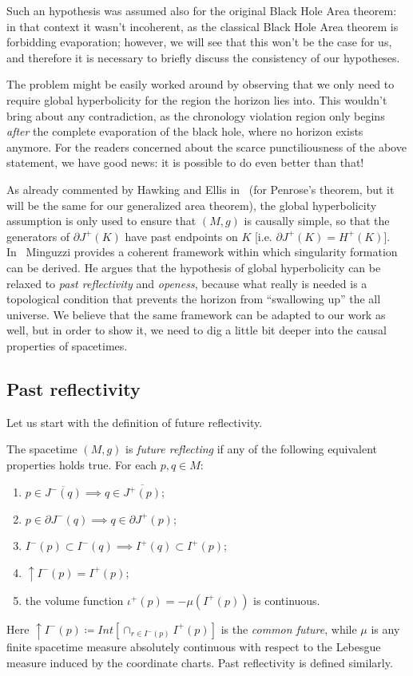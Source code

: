 Such an hypothesis was assumed also for the original Black Hole Area theorem: in that context it wasn't incoherent, as the classical Black Hole Area theorem is forbidding evaporation; however, we will see that this won't be the case for us, and therefore it is necessary to briefly discuss the consistency of our hypotheses.

The problem might be easily worked around by observing that we only need to require global hyperbolicity for the region the horizon lies into. This wouldn't bring about any contradiction, as the chronology violation region only begins \emph{after} the complete evaporation of the black hole, where no horizon exists anymore. For the readers concerned about the scarce punctiliousness of the above statement, we have good news: it is possible to do even better than that! 

As already commented by Hawking and Ellis in~\cite[]{hawking1973large} (for Penrose's theorem, but it will be the same for our generalized area theorem), the global hyperbolicity assumption is only used to ensure that \((M, g)\) is causally simple, so that the generators of \(\partial J^+(K)\) have past endpoints on \(K\) [i.e. \(\partial J^+(K) = H^+(K)\)].
In~\cite{minguzzi2020gravitational} Minguzzi provides a coherent framework within which singularity formation can be derived. He argues that the hypothesis of global hyperbolicity can be relaxed to \emph{past reflectivity} and \emph{openess}, because what really is needed is a topological condition that prevents the horizon from ``swallowing up'' the all universe. We believe that the same framework can be adapted to our work as well, but in order to show it, we need to dig a little bit deeper into the causal properties of spacetimes.

\clearpage

\subsection{Past reflectivity}
	\label{subsec:past-reflectivity}
	Let us start with the definition of future reflectivity.
	\begin{definition}
		The spacetime \((M,g)\) is \emph{future reflecting} if any of the following equivalent properties holds true. For each \(p, q\in M\):
		\begin{enumerate}
			\item \(p\in \overline{ J^-(q)} \implies q\in \overline{J^+(p)}\);
			\item  \(p\in \partial J^-(q) \implies q\in \partial J^+(p)\);
			\item \(I^-(p) \subset I^-(q) \implies I^+(q) \subset I^+(p)\);
			\item \(\uparrow I^-(p) = I^+(p)\);
			\item the volume function \(\iota^+(p) = - \mu(I^+(p))\) is continuous.
		\end{enumerate}
	\end{definition}
	Here \(\uparrow I^-(p) \coloneqq Int\left[\cap_{r\in I^-(p)}I^+(p)\right]\) is the \emph{common future}, while \(\mu\) is any finite spacetime measure absolutely continuous with respect to the Lebesgue measure induced by the coordinate charts. Past reflectivity is defined similarly.

